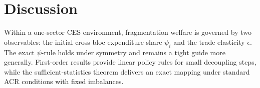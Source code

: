 \documentclass[11pt]{article}
\begin{document}
\section{Discussion}
Within a one-sector CES environment, fragmentation welfare is governed by two observables: the initial cross-bloc expenditure share $\psi_i$ and the trade elasticity $\epsilon$. The exact $\psi$-rule holds under symmetry and remains a tight guide more generally. First-order results provide linear policy rules for small decoupling steps, while the sufficient-statistics theorem delivers an exact mapping under standard ACR conditions with fixed imbalances.
\end{document}
